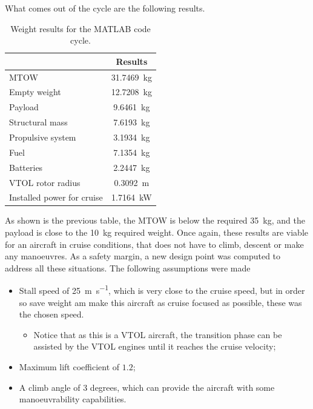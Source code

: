 \documentclass[english,fira]{ist-report}
\begin{document}
What comes out of the cycle are the following results.

\begin{table}[ht]
    \centering
    \begin{tabular}{l c}\toprule
         & \textbf{Results} \\
        \midrule
        MTOW                        & \SI{31.7469}{\kilogram} \\
        Empty weight                & \SI{12.7208}{\kilogram} \\
        Payload                     & \SI{9.6461}{\kilogram} \\
        Structural mass             & \SI{7.6193}{\kilogram} \\
        Propulsive system           & \SI{3.1934}{\kilogram} \\
        Fuel                        & \SI{7.1354}{\kilogram} \\
        Batteries                   & \SI{2.2447}{\kilogram} \\
        VTOL rotor radius           & \SI{0.3092}{\meter} \\
        Installed power for cruise  & \SI{1.7164}{\kilo\watt} \\
        \bottomrule
    \end{tabular}
    \caption{Weight results for the MATLAB code cycle.}
    \label{tab:matlabcycle}
\end{table}
As shown is the previous table, the MTOW is below the required \SI{35}{\kilogram}, and the payload is close to the \SI{10}{\kilogram} required weight. Once again, these results are viable for an aircraft in cruise conditions, that does not have to climb, descent or make any manoeuvres. As a safety margin, a new design point was computed to address all these situations. The following assumptions were made
\begin{itemize}
    \item Stall speed of \SI{25}{\meter\per\second}, which is very close to the cruise speed, but in order so save weight am make this aircraft as cruise focused as possible, these was the chosen speed.
    \begin{itemize}
        \item Notice that as this is a VTOL aircraft, the transition phase can be assisted by the VTOL engines until it reaches the cruise velocity;
    \end{itemize}
    \item Maximum lift coefficient of $1.2$;
    \item A climb angle of $3$ degrees, which can provide the aircraft with some manoeuvrability capabilities.
\end{itemize}
\end{document}
